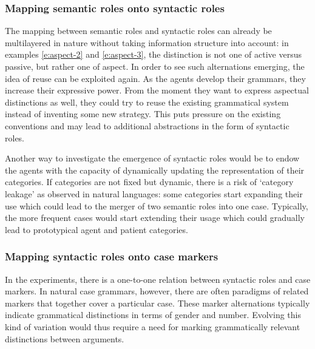 \subsubsection{Mapping semantic roles onto syntactic roles}
 The mapping between semantic roles and syntactic roles can already be multilayered in nature without taking information structure into account: in examples \ref{e:aspect-2} and \ref{e:aspect-3}, the distinction is not one of active versus passive, but rather one of aspect. In order to see such alternations emerging, the idea of reuse can be exploited again. As the agents develop their grammars, they increase their expressive power. From the moment they want to express aspectual distinctions as well, they could try to reuse the existing grammatical system instead of inventing some new strategy. This puts pressure on the existing conventions and may lead to additional abstractions in the form of syntactic roles.

Another way to investigate the emergence of syntactic roles would be to endow the agents with the capacity of dynamically updating the representation of their categories. If categories are not fixed but dynamic, there is a risk of `category leakage' as observed in natural languages: some categories start expanding their use which could lead to the merger of two semantic roles into one case. Typically, the more frequent cases would start extending their usage which could gradually lead to prototypical agent and patient categories.


\subsubsection{Mapping syntactic roles onto case markers}
 In the experiments, there is a one-to-one relation between syntactic roles and case markers. In natural case grammars, however, there are often paradigms of related markers that together cover a particular case. These marker alternations typically indicate grammatical distinctions in terms of gender and number. Evolving this kind of variation would thus require a need for marking grammatically relevant distinctions between arguments.

